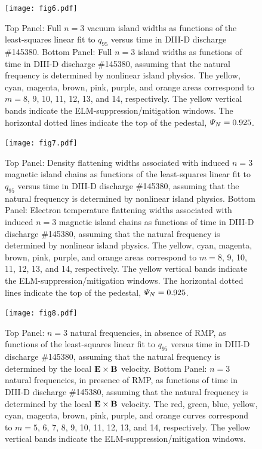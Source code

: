 \documentclass[12pt,prb,aps]{revtex4-1}
\begin{document}
\begin{figure}
\texttt{[image: fig6.pdf]}
\caption{Top Panel: Full  $n=3$ vacuum island widths as functions of the least-squares linear fit to $q_{95}$ versus time 
in   DIII-D discharge \#145380.
Bottom Panel:  Full $n=3$ island widths as functions of time
in   DIII-D discharge \#145380, assuming that the natural frequency is determined by nonlinear island physics. The yellow, cyan, magenta, brown, pink,
purple, and orange  areas correspond to $m=8$, 9, 10, 11, 12, 13, and 14, respectively. The yellow vertical bands indicate the ELM-suppression/mitigation windows. 
The horizontal dotted lines indicate the top of the pedestal, ${\mit\Psi}_N=0.925$.} \label{fig6}
\end{figure}

\begin{figure}
\texttt{[image: fig7.pdf]}
\caption{Top Panel: Density flattening widths associated with induced $n=3$ magnetic island  chains as functions of the least-squares linear fit to $q_{95}$ versus time
in   DIII-D discharge \#145380, assuming that the natural frequency is determined by nonlinear island physics.
Bottom Panel:  Electron temperature flattening widths associated with induced $n=3$ magnetic island chains as functions of time
in   DIII-D discharge \#145380, assuming that the natural frequency is determined by nonlinear island physics. The yellow, cyan, magenta, brown, pink,
purple, and orange  areas correspond to $m=8$, 9, 10, 11, 12, 13, and 14, respectively. The yellow vertical bands indicate the ELM-suppression/mitigation windows. 
The horizontal dotted lines indicate the top of the pedestal, ${\mit\Psi}_N=0.925$.} \label{fig7}
\end{figure}

\begin{figure}
\texttt{[image: fig8.pdf]}
\caption{Top Panel: $n=3$ natural frequencies, in absence of RMP, as functions of the least-squares linear fit to $q_{95}$ versus time
in   DIII-D discharge \#145380, assuming that the natural frequency is determined by the local ${\bf E}\times {\bf B}$
velocity.
Bottom Panel:  $n=3$ natural frequencies, in presence of RMP, as functions of time
in   DIII-D discharge \#145380, assuming that the natural frequency is  determined by the local ${\bf E}\times {\bf B}$
velocity. The red, green, blue, yellow, cyan, magenta, brown, pink,
purple, and orange  curves correspond to $m=5$, 6, 7, 8, 9, 10, 11, 12, 13, and 14, respectively. The yellow vertical bands indicate the ELM-suppression/mitigation windows.} \label{fig8}
\end{figure}
\end{document}
